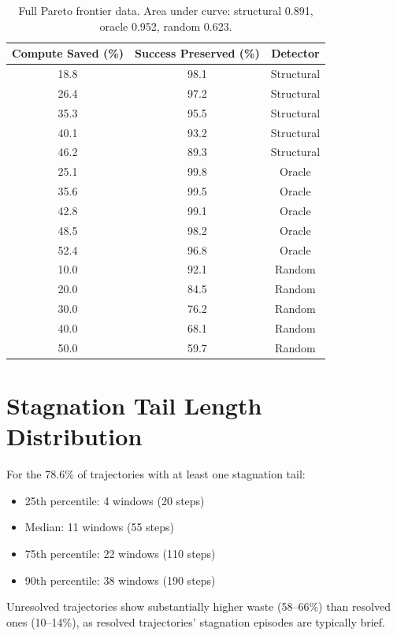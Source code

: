 \documentclass[11pt,a4paper]{article}
\begin{document}
\begin{table}[h]
\centering
\small
\begin{tabular}{ccc}
\toprule
\textbf{Compute Saved (\%)} & \textbf{Success Preserved (\%)} & \textbf{Detector} \\
\midrule
18.8 & 98.1 & Structural \\
26.4 & 97.2 & Structural \\
35.3 & 95.5 & Structural \\
40.1 & 93.2 & Structural \\
46.2 & 89.3 & Structural \\
\midrule
25.1 & 99.8 & Oracle \\
35.6 & 99.5 & Oracle \\
42.8 & 99.1 & Oracle \\
48.5 & 98.2 & Oracle \\
52.4 & 96.8 & Oracle \\
\midrule
10.0 & 92.1 & Random \\
20.0 & 84.5 & Random \\
30.0 & 76.2 & Random \\
40.0 & 68.1 & Random \\
50.0 & 59.7 & Random \\
\bottomrule
\end{tabular}
\caption{Full Pareto frontier data. Area under curve: structural 0.891, oracle 0.952, random 0.623.}
\label{tab:pareto_full}
\end{table}

\section{Stagnation Tail Length Distribution}
\label{app:tail}

For the 78.6\% of trajectories with at least one stagnation tail:
\begin{itemize}
\item 25th percentile: 4 windows (20 steps)
\item Median: 11 windows (55 steps)
\item 75th percentile: 22 windows (110 steps)
\item 90th percentile: 38 windows (190 steps)
\end{itemize}

Unresolved trajectories show substantially higher waste (58--66\%) than resolved ones (10--14\%), as resolved trajectories' stagnation episodes are typically brief.
\end{document}
